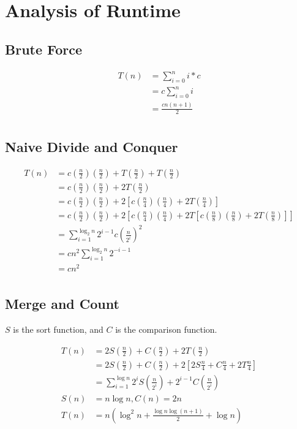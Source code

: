 \documentclass[12pt,letterpaper]{article}
\begin{document}
\section{Analysis of Runtime}
\subsection{Brute Force}
\begin{align*}
  T(n) &= \sum_{i=0}^{n} i * c \\
       &= c \sum_{i=0}^{n} i \\
       &= \frac{cn(n+1)}{2} \\
\end{align*}

\subsection{Naive Divide and Conquer}
\begin{align*}
  T(n) &= c(\frac{n}{2})(\frac{n}{2}) + T(\frac{n}{2}) + T(\frac{n}{2}) \\
       &= c(\frac{n}{2})(\frac{n}{2}) + 2T(\frac{n}{2}) \\
       &= c(\frac{n}{2})(\frac{n}{2}) + 2[c(\frac{n}{4})(\frac{n}{4}) + 2T(\frac{n}{4})] \\
       &= c(\frac{n}{2})(\frac{n}{2}) + 2[c(\frac{n}{4})(\frac{n}{4}) + 2T[c(\frac{n}{8})(\frac{n}{8}) + 2T(\frac{n}{8})]] \\
       &= \sum_{i=1}^{\log_2 n} 2^{i-1} c (\frac{n}{2^i})^2 \\
       &= cn^2 \sum_{i=1}^{\log_2 n} 2^{-i-1} \\
       &= cn^2 \\
\end{align*}

\subsection{Merge and Count}
$S$ is the sort function, and $C$ is the comparison function.

\begin{align*}
  T(n) &= 2S(\frac{n}{2}) + C(\frac{n}{2}) + 2T(\frac{n}{2}) \\
       &= 2S(\frac{n}{2}) + C(\frac{n}{2}) + 2[2S\frac{n}{4} + C\frac{n}{4} + 2T\frac{n}{4}] \\
       &= \sum_{i=1}^{\log n} 2^i S(\frac{n}{2^i}) + 2^{i-1} C(\frac{n}{2^i}) \\
  S(n) &= n \log n , C(n) = 2n \\
  T(n) &= n(\log^2 n + \frac{\log n \log (n + 1)}{2} + \log n) \\
\end{align*}
\end{document}
